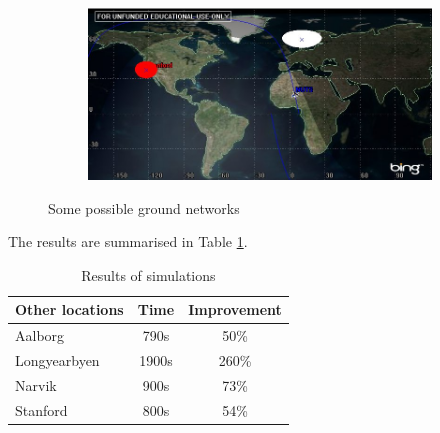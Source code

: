 \begin{figure}
\begin{subfigure}{.5\textwidth}
	\label{fig:range_ntnu_narvik}
\end{subfigure}
\begin{subfigure}{.5\textwidth}
	\centering
	\includegraphics[width=\textwidth]{Figures/range_ntnu_stanford}
	\label{fig:range_ntnu_narvik}
\end{subfigure}
\caption{Some possible ground networks}
\label{fig:ground_networks}
\end{figure}

The results are summarised in Table \ref{tab:networks}.

\begin{table}
	\begin{center}
	\begin{tabular}{l | c c}
  	Other locations & Time & Improvement \\
	\hline \hline
	Aalborg & 790s &  50\% \\
	\hline
	Longyearbyen & 1900s & 260\% \\
	\hline
	Narvik & 900s & 73\%  \\
	\hline
	Stanford & 800s & 54\% 
	\end{tabular}
	\end{center}
	\caption{Results of simulations}
	\label{tab:networks}
\end{table}